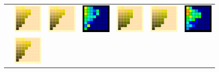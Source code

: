 \begin{figure}[t!]
{\begin{tabular}{ccccccc}
			&\includegraphics[width=.155\linewidth]{img/results_uplift_page13_originalFL11.png}
			&
			\includegraphics[width=.155\linewidth]{img/results_uplift_page13_sigmoidFL11.png}
			& 
			\includegraphics[width=.155\linewidth]{img/results_uplift_page13_diff_sigmoidFL11.png}
			&\quad
			\includegraphics[width=.155\linewidth]{img/results_uplift_page14_originalFL11.png}
			&
			\includegraphics[width=.155\linewidth]{img/results_uplift_page14_sigmoidFL11.png}
			&
			\includegraphics[width=.155\linewidth]{img/results_uplift_page14_diff_sigmoidFL11.png}
			\\ \raisebox{0.5cm}[0pt][0pt]{\parbox[c][0pt][c]{0cm}{\hspace{-1.5em}\\[20pt]}\par}
			&
			\includegraphics[width=.155\linewidth]{img/results_uplift_page13_originalFL11.png}

\end{tabular}}
\end{figure}
